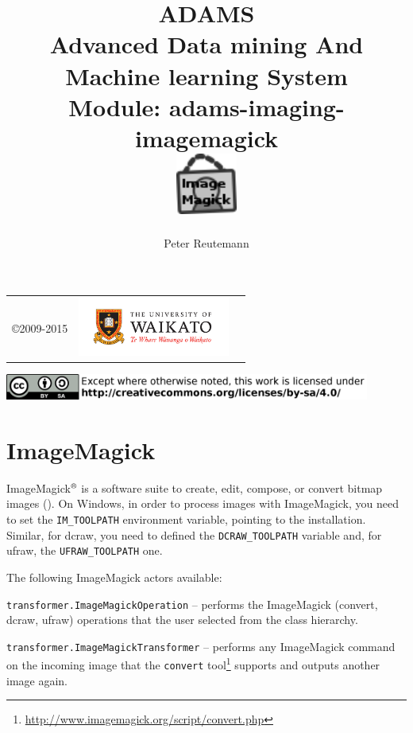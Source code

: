 \documentclass[a4paper]{book}
\title{
  \textbf{ADAMS} \\
  {\Large \textbf{A}dvanced \textbf{D}ata mining \textbf{A}nd \textbf{M}achine
  learning \textbf{S}ystem} \\
  {\Large Module: adams-imaging-imagemagick} \\
  \vspace{1cm}
  \includegraphics[width=2cm]{images/imaging-imagemagick-module.png} \\
}
\author{
  Peter Reutemann
}
\begin{document}
\begin{titlepage}
\maketitle

\thispagestyle{empty}
\center
\begin{table}[b]
	\begin{tabular}{c l l}
		\parbox[c][2cm]{2cm}{\copyright 2009-2015} &
		\parbox[c][2cm]{5cm}{\includegraphics[width=5cm]{images/coat_of_arms.pdf}} \\
	\end{tabular}
	\includegraphics[width=12cm]{images/cc.png} \\
\end{table}

\end{titlepage}

\tableofcontents
\listoffigures


\chapter{ImageMagick}
ImageMagick$\textsuperscript{\textregistered}$ is a software suite to create,
edit, compose, or convert bitmap images (\cite{imagemagick}). On Windows, in order to
process images with ImageMagick, you need to set the \texttt{IM\_TOOLPATH} 
environment variable, pointing to the installation. Similar, for dcraw, you 
need to defined the \texttt{DCRAW\_TOOLPATH} variable and, for ufraw, the
\texttt{UFRAW\_TOOLPATH} one.

The following ImageMagick actors available:
\begin{tight_itemize}
	\item \texttt{transformer.ImageMagickOperation} -- performs the ImageMagick
	(convert, dcraw, ufraw) operations that the user selected from the class
	hierarchy.
	\item \texttt{transformer.ImageMagickTransformer} -- performs any ImageMagick
	command on the incoming image that the \texttt{convert} tool\footnote{\url{http://www.imagemagick.org/script/convert.php}{}} supports and
	outputs another image again.
\end{tight_itemize}
\end{document}
